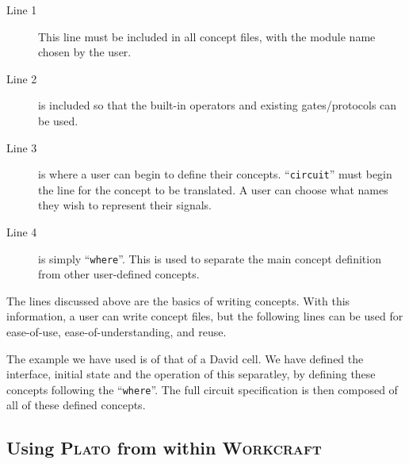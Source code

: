 \documentclass[british,conference,compsoc]{IEEEtran}
\newcommand{\noun}[1]{\textsc{#1}}
\begin{document}
\begin{description}
  \item [Line 1]  This line must be included in all concept files, with the 
  module name chosen by the user.
  
  \item [Line 2] is included so that the built-in operators and existing 
  gates/protocols can be used. 
  
  \item [Line 3] is where a user can begin to define their concepts. 
  ``\texttt{circuit}'' must begin the line for the concept to be translated.
  A user can choose what names they wish to represent their signals.
  
  \item [Line 4] is simply ``\texttt{where}''. This is used to separate the main
  concept definition from other user-defined concepts.

\end{description}

\vspace{-1mm}

The lines discussed above are the basics of writing concepts. With this 
information, a user can write concept files, but the following lines can be 
used for ease-of-use, ease-of-understanding, and reuse. 

The example we have used is of that of a David cell. We have defined the 
interface, initial state and the operation of this separatley, by defining 
these concepts following the ``\texttt{where}''. The full circuit 
specification is then composed of all of these defined concepts. 

\subsection{Using \noun{Plato} from within \noun{Workcraft} \label{sec:workcraft_usage}}

\vspace{-2mm}
\end{document}
